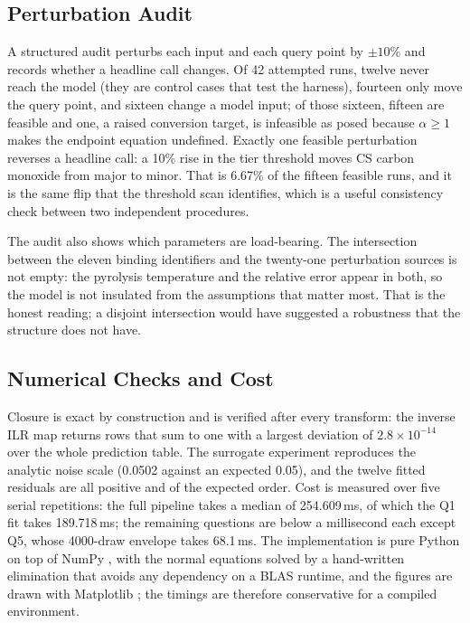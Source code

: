 \documentclass[withoutpreface,bwprint]{apmcmthesis}
\begin{document}
\subsection{Perturbation Audit}
A structured audit perturbs each input and each query point by $\pm10\%$ and records whether a headline call changes. Of 42 attempted runs, twelve never reach the model (they are control cases that test the harness), fourteen only move the query point, and sixteen change a model input; of those sixteen, fifteen are feasible and one, a raised conversion target, is infeasible as posed because $\alpha\ge1$ makes the endpoint equation undefined. Exactly one feasible perturbation reverses a headline call: a 10\% rise in the tier threshold moves CS carbon monoxide from major to minor. That is 6.67\% of the fifteen feasible runs, and it is the same flip that the threshold scan identifies, which is a useful consistency check between two independent procedures.

The audit also shows which parameters are load-bearing. The intersection between the eleven binding identifiers and the twenty-one perturbation sources is not empty: the pyrolysis temperature and the relative error appear in both, so the model is not insulated from the assumptions that matter most. That is the honest reading; a disjoint intersection would have suggested a robustness that the structure does not have.

\subsection{Numerical Checks and Cost}
Closure is exact by construction and is verified after every transform: the inverse ILR map returns rows that sum to one with a largest deviation of $2.8\times10^{-14}$ over the whole prediction table. The surrogate experiment reproduces the analytic noise scale (0.0502 against an expected 0.05), and the twelve fitted residuals are all positive and of the expected order. Cost is measured over five serial repetitions: the full pipeline takes a median of 254.609\,ms, of which the Q1 fit takes 189.718\,ms; the remaining questions are below a millisecond each except Q5, whose 4000-draw envelope takes 68.1\,ms. The implementation is pure Python on top of NumPy \cite{Harris2020}, with the normal equations solved by a hand-written elimination that avoids any dependency on a BLAS runtime, and the figures are drawn with Matplotlib \cite{Hunter2007}; the timings are therefore conservative for a compiled environment.
\end{document}
